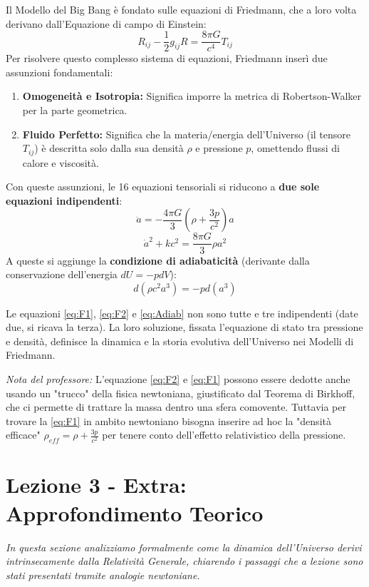 \documentclass[11pt,a4paper]{report}
\begin{document}
Il Modello del Big Bang è fondato sulle equazioni di Friedmann, che a loro volta derivano dall'Equazione di campo di Einstein:
\begin{equation}
R_{ij} - \frac{1}{2}g_{ij}R = \frac{8\pi G}{c^4}T_{ij}
\end{equation}
Per risolvere questo complesso sistema di equazioni, Friedmann inserì due assunzioni fondamentali:
\begin{enumerate}
    \item \textbf{Omogeneità e Isotropia:} Significa imporre la metrica di Robertson-Walker per la parte geometrica.
    \item \textbf{Fluido Perfetto:} Significa che la materia/energia dell'Universo (il tensore $T_{ij}$) è descritta solo dalla sua densità $\rho$ e pressione $p$, omettendo flussi di calore e viscosità.
\end{enumerate}
Con queste assunzioni, le 16 equazioni tensoriali si riducono a \textbf{due sole equazioni indipendenti}:
\begin{equation}
\ddot{a} = -\frac{4\pi G}{3}\left(\rho + \frac{3p}{c^2}\right) a
\label{eq:F1}
\end{equation}
\begin{equation}
\dot{a}^2 + k c^2 = \frac{8\pi G}{3} \rho a^2
\label{eq:F2}
\end{equation}
A queste si aggiunge la \textbf{condizione di adiabaticità} (derivante dalla conservazione dell'energia $dU = -p dV$):
\begin{equation}
d(\rho c^2 a^3) = -p d(a^3)
\label{eq:Adiab}
\end{equation}

Le equazioni \eqref{eq:F1}, \eqref{eq:F2} e \eqref{eq:Adiab} non sono tutte e tre indipendenti (date due, si ricava la terza). La loro soluzione, fissata l'equazione di stato tra pressione e densità, definisce la dinamica e la storia evolutiva dell'Universo nei Modelli di Friedmann. 

\textit{Nota del professore:} L'equazione \eqref{eq:F2} e \eqref{eq:F1} possono essere dedotte anche usando un "trucco" della fisica newtoniana, giustificato dal Teorema di Birkhoff, che ci permette di trattare la massa dentro una sfera comovente. Tuttavia per trovare la \eqref{eq:F1} in ambito newtoniano bisogna inserire ad hoc la "densità efficace" $\rho_{eff} = \rho + \frac{3p}{c^2}$ per tenere conto dell'effetto relativistico della pressione.

\newpage
\section{Lezione 3 - Extra: Approfondimento Teorico}
\textit{In questa sezione analizziamo formalmente come la dinamica dell'Universo derivi intrinsecamente dalla Relatività Generale, chiarendo i passaggi che a lezione sono stati presentati tramite analogie newtoniane.}
\end{document}
